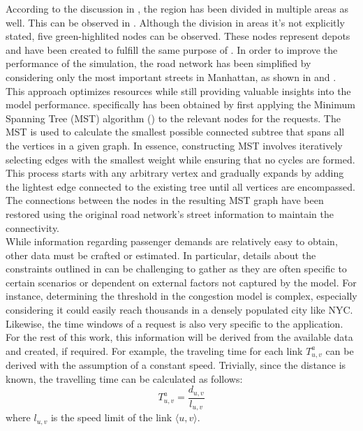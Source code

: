 According to the discussion in , the region has been divided in multiple areas as well. This can be observed in . Although the division in areas it's not explicitly stated, five green-highlited nodes can be observed. These nodes represent depots and have been created to fulfill the same purpose of . In order to improve the performance of the simulation, the road network has been simplified by considering only the most important streets in Manhattan, as shown in  and . This approach optimizes resources while still providing valuable insights into the model performance.  specifically has been obtained by first applying the Minimum Spanning Tree (MST) algorithm (\cite{networkx2021}) to the relevant nodes for the requests. The MST is used to calculate the smallest possible connected subtree that spans all the vertices in a given graph. In essence, constructing MST involves iteratively selecting edges with the smallest weight while ensuring that no cycles are formed. This process starts with any arbitrary vertex and gradually expands by adding the lightest edge connected to the existing tree until all vertices are encompassed. The connections between the nodes in the resulting MST graph have been restored using the original road network's street information to maintain the connectivity.\\
While information regarding passenger demands are relatively easy to obtain, other data must be crafted or estimated. In particular, details about the constraints outlined in  can be challenging to gather as they are often specific to certain scenarios or dependent on external factors not captured by the model. For instance, determining the threshold in the congestion model is complex, especially considering it could easily reach thousands in a densely populated city like NYC. Likewise, the time windows of a request is also very specific to the application. For the rest of this work, this information will be derived from the available data and created, if required. For example, the traveling time for each link $T^a_{u,v}$ can be derived with the assumption of a constant speed. Trivially, since the distance is known, the travelling time can be calculated as follows: \\
\begin{equation}
	T^a_{u,v} = \dfrac{d_{u,v} }{l_{u,v}}
\end{equation}
where $l_{u,v}$ is the speed limit of the link $\langle u,v\rangle$. \\
